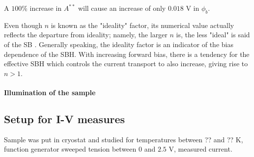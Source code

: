 A $100 \%$ increase in $A^{**}$ will cause an increase of only $0.018$ V in $\phi_b$.


Even though $n$ is known as the  "ideality" factor, its numerical value actually reflects the departure from ideality; namely, the larger $n$ is, the less "ideal" is said of the SB \cite{tung_recent_2001}.
Generally speaking, the ideality factor is an indicator of the bias dependence of the SBH. With increasing forward bias, there is a tendency for the effective SBH which controls the current transport to also increase, giving rise to $n > 1$.

\paragraph{Illumination of the sample}


\subsection{Setup for I-V measures}
Sample was put in cryostat and studied for temperatures between ?? and ?? K, function generator sweeped tension between $0$ and $2.5$ V, measured current.
